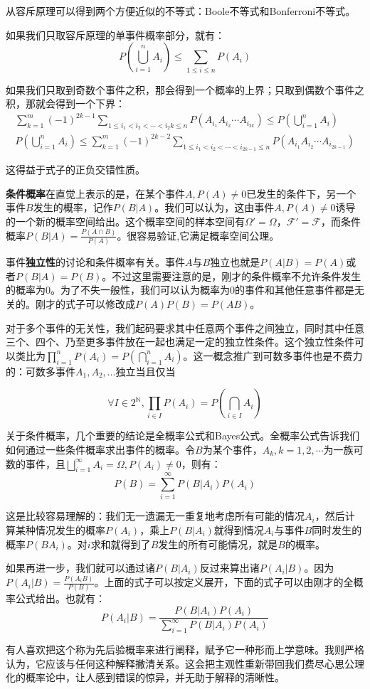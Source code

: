 从容斥原理可以得到两个方便近似的不等式：Boole不等式和Bonferroni不等式。

如果我们只取容斥原理的单事件概率部分，就有：
\[
P(\bigcup_{i=1}^n A_i) \leq \sum_{1\leq i\leq n}P(A_{i})
\]

如果我们只取到奇数个事件之积，那会得到一个概率的上界；只取到偶数个事件之积，那就会得到一个下界：
\begin{align*}
\sum_{k=1}^{m}(-1)^{2k-1}\sum_{1\leq i_1<i_2<\cdots<i_2k\leq n}P(A_{i_1}A_{i_2}\cdots A_{i_{2k}})\leq P(\bigcup_{i=1}^n A_i)\\
P(\bigcup_{i=1}^n A_i) \leq \sum_{k=1}^{m}(-1)^{2k-2}\sum_{1\leq i_1<i_2<\cdots<i_{2k-1}\leq n}P(A_{i_1}A_{i_2}\cdots A_{i_{2k-1}})
\end{align*}

这得益于式子的正负交错性质。

\textbf{条件概率}在直觉上表示的是，在某个事件$A, P(A)\neq 0$已发生的条件下，另一个事件$B$发生的概率，记作$P(B|A)$。我们可以认为，这由事件$A,P(A)\neq 0$诱导的一个新的概率空间给出。这个概率空间的样本空间有$\Omega'=\Omega$，$\mathcal{F}'=\mathcal{F}$，而条件概率$P(B|A)=\frac{P(A\cap B)}{P(A)}$。很容易验证,它满足概率空间公理。

事件\textbf{独立性}的讨论和条件概率有关。事件$A$与$B$独立也就是$P(A|B)=P(A)$或者$P(B|A)=P(B)$。不过这里需要注意的是，刚才的条件概率不允许条件发生的概率为$0$。为了不失一般性，我们可以认为概率为$0$的事件和其他任意事件都是无关的。刚才的式子可以修改成$P(A)P(B)=P(AB)$。

对于多个事件的无关性，我们起码要求其中任意两个事件之间独立，同时其中任意三个、四个、乃至更多事件放在一起也满足一定的独立性条件。这个独立性条件可以类比为$\prod_{i=1}^nP(A_i)=P(\bigcap_{i=1}^nA_i)$。这一概念推广到可数多事件也是不费力的：可数多事件$A_1,A_2,\ldots$独立当且仅当

\[
\forall I \in 2^{\mathbb{N}}, \prod_{i\in I}P(A_i)=P(\bigcap_{i\in I}A_i)
\]

关于条件概率，几个重要的结论是全概率公式和Bayes公式。全概率公式告诉我们如何通过一些条件概率求出事件的概率。令$B$为某个事件，$A_k,k=1,2,\cdots$为一族可数的事件，且$\bigsqcup_{i=1}^\infty A_i = \Omega, P(A_i)\neq 0$，则有：
\[
P(B)=\sum_{i=1}^{\infty}P(B|A_i)P(A_i)
\]

这是比较容易理解的：我们无一遗漏无一重复地考虑所有可能的情况$A_i$，然后计算某种情况发生的概率$P(A_i)$，乘上$P(B|A_i)$就得到情况$A_i$与事件$B$同时发生的概率$P(BA_i)$。对$i$求和就得到了$B$发生的所有可能情况，就是$B$的概率。

如果再进一步，我们就可以通过诸$P(B|A_i)$反过来算出诸$P(A_i|B)$。因为$P(A_i|B)=\frac{P(A_iB)}{P(B)}$。上面的式子可以按定义展开，下面的式子可以由刚才的全概率公式给出。也就有：
\[
P(A_i|B)=\frac{P(B|A_i)P(A_i)}{\sum_{i=1}^{\infty}P(B|A_i)P(A_i)}
\]

有人喜欢把这个称为先后验概率来进行阐释，赋予它一种形而上学意味。我则严格认为，它应该与任何这种解释撇清关系。这会把主观性重新带回我们费尽心思公理化的概率论中，让人感到错误的惊异，并无助于解释的清晰性。
